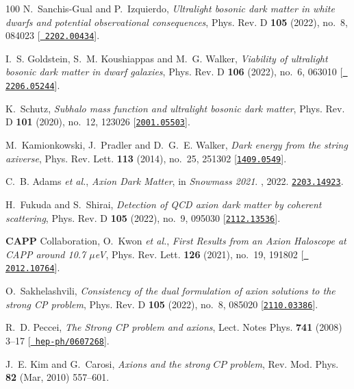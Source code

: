 \begin{thebibliography}{100}
N.~Sanchis-Gual and P.~Izquierdo,  {\em {Ultralight bosonic dark matter in
  white dwarfs and potential observational consequences}}, Phys. Rev. D {\bf
  105} (2022), no.~8, 084023 [\href{http://www.arXiv.org/abs/2202.00434}{{\tt
  2202.00434}}].

I.~S. Goldstein, S.~M. Koushiappas and M.~G. Walker,  {\em {Viability of
  ultralight bosonic dark matter in dwarf galaxies}}, Phys. Rev. D {\bf 106}
  (2022), no.~6, 063010 [\href{http://www.arXiv.org/abs/2206.05244}{{\tt
  2206.05244}}].

K.~Schutz,  {\em {Subhalo mass function and ultralight bosonic dark matter}},
  Phys. Rev. D {\bf 101} (2020), no.~12, 123026
  [\href{http://www.arXiv.org/abs/2001.05503}{{\tt 2001.05503}}].

M.~Kamionkowski, J.~Pradler and D.~G.~E. Walker,  {\em {Dark energy from the
  string axiverse}}, Phys. Rev. Lett. {\bf 113} (2014), no.~25, 251302
  [\href{http://www.arXiv.org/abs/1409.0549}{{\tt 1409.0549}}].

C.~B. Adams {\em et al.},  {\em {Axion Dark Matter}}, in {\em {Snowmass 2021}}.
, 2022.
\newblock \href{http://www.arXiv.org/abs/2203.14923}{{\tt 2203.14923}}.

H.~Fukuda and S.~Shirai,  {\em {Detection of QCD axion dark matter by coherent
  scattering}}, Phys. Rev. D {\bf 105} (2022), no.~9, 095030
  [\href{http://www.arXiv.org/abs/2112.13536}{{\tt 2112.13536}}].

{\bf CAPP} Collaboration, O.~Kwon {\em et al.},  {\em {First Results from an
  Axion Haloscope at CAPP around 10.7 $\mu$eV}}, Phys. Rev. Lett. {\bf 126}
  (2021), no.~19, 191802 [\href{http://www.arXiv.org/abs/2012.10764}{{\tt
  2012.10764}}].

O.~Sakhelashvili,  {\em {Consistency of the dual formulation of axion solutions
  to the strong CP problem}}, Phys. Rev. D {\bf 105} (2022), no.~8, 085020
  [\href{http://www.arXiv.org/abs/2110.03386}{{\tt 2110.03386}}].

R.~D. Peccei,  {\em {The Strong CP problem and axions}}, Lect. Notes Phys. {\bf
  741} (2008) 3--17 [\href{http://www.arXiv.org/abs/hep-ph/0607268}{{\tt
  hep-ph/0607268}}].

J.~E. Kim and G.~Carosi,  {\em Axions and the strong $CP$ problem}, Rev. Mod.
  Phys. {\bf 82} (Mar, 2010) 557--601.


\end{thebibliography}
